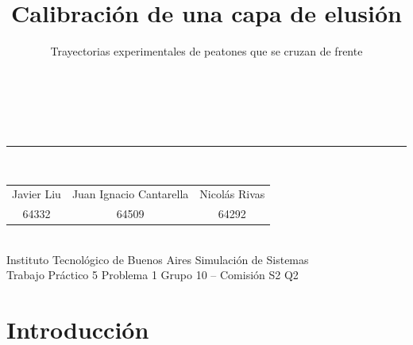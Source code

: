 \documentclass[aspectratio=169,11pt]{beamer}
\title{Calibración de una capa de elusión}
\subtitle{Trayectorias experimentales de peatones que se cruzan de frente}
\begin{document}
\begin{frame}
    \vfill
    \begin{center}
        {\inserttitle}\\[0.3em]
        {\large\color{gris}\insertsubtitle}\\[1.0em]
        \textcolor{azul!30}{\rule{0.45\textwidth}{1pt}}\\[1.0em]
        {\small
        \begin{tabular}{ccc}
            Javier Liu & Juan Ignacio Cantarella & Nicolás Rivas \\[0.15em]
            {\footnotesize\color{gris}64332} &
            {\footnotesize\color{gris}64509} &
            {\footnotesize\color{gris}64292}
        \end{tabular}}\\[1.4em]
        {\footnotesize Instituto Tecnológico de Buenos Aires \quad\textbar\quad Simulación de Sistemas}\\[0.3em]
        {\footnotesize\color{gris} Trabajo Práctico 5 \enspace\textbar\enspace Problema 1 \enspace\textbar\enspace Grupo 10 -- Comisión S2 \enspace\textbar{} Q2}
    \end{center}
    \vfill
\end{frame}

\AtBeginSection[]{%
    \begin{frame}
        \vfill
        \begin{center}
            {\Large\bfseries\color{azul}\insertsectionhead}\\[0.5em]
            \textcolor{azul!30}{\rule{0.28\textwidth}{1pt}}
        \end{center}
        \vfill
    \end{frame}}

\section{Introducción}
\end{document}
